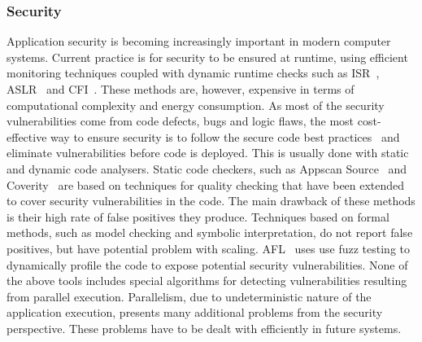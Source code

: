 \documentclass[a4paper,11pt]{article}
\begin{document}
\subsubsection{Security}
\label{sect:security}
Application security is becoming increasingly important in modern computer systems.
Current practice is for security to be ensured at runtime, using efficient monitoring
techniques coupled with dynamic runtime checks such as ISR~\cite{isr}, ASLR~\cite{aslr}
and CFI~\cite{cfi}. These methods are, however, expensive in terms of computational
complexity and energy consumption. As most of the security vulnerabilities come from
code defects, bugs and logic flaws, the most cost-effective way to ensure security is
to follow the secure code best practices~\cite{OWASP} and eliminate vulnerabilities
before code is deployed. This is usually done with static and dynamic code analysers.
Static code checkers, such as Appscan Source~\cite{AppScan} and Coverity~\cite{Coverity}
are based on techniques for quality checking that
have been extended to cover security vulnerabilities in the code. The main drawback of 
these methods is their high rate of false positives they produce. Techniques based on
formal methods, such as model checking and symbolic interpretation, do not report false 
positives, but have potential problem with scaling. AFL~\cite{AFL} uses use fuzz testing 
to dynamically profile the code to expose potential security vulnerabilities. 
None of the above tools includes special algorithms for detecting vulnerabilities 
resulting from parallel execution. Parallelism, due to undeterministic nature of the
application execution, presents many additional problems from the security perspective. These problems have to be dealt with efficiently
in future systems.
\end{document}
